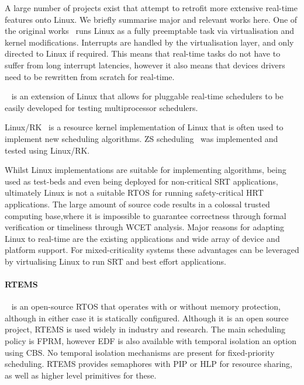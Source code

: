 A large number of projects exist that attempt to retrofit more extensive real-time features onto
Linux.  We briefly summarise major and relevant works here.  One of the original
works~\citep{Yodaiken_Barabanov_97} runs Linux as a fully preemptable task via virtualisation and
kernel modifications.  Interrupts are handled by the virtualisation layer, and only directed to
Linux if required.  This means that real-time tasks do not have to suffer from long interrupt
latencies, however it also means that devices drivers need to be rewritten from scratch for
real-time.

\litmus~\citep{Calandrino_LBDA_07} is an extension of Linux that allows for pluggable real-time
schedulers to be easily developed for testing multiprocessor schedulers.

Linux/RK~\citep{Oikawa_Rajkumar_98} is a resource kernel implementation of Linux that is often used to
implement new scheduling algorithms. \Gls{ZS} scheduling~\citep{deNiz_LR_09} was implemented and
tested using Linux/RK.

Whilst Linux implementations are suitable for implementing algorithms, being used as test-beds and
even being deployed for non-critical \gls{SRT} applications, ultimately Linux is not a suitable
\gls{RTOS} for running safety-critical \gls{HRT} applications. The large amount of source code
results in a colossal trusted computing base,where it is impossible to guarantee correctness through
formal verification or timeliness through {\gls{WCET}} analysis.  Major reasons for adapting Linux
to real-time are the existing applications and wide array of device and platform support. For
mixed-criticality systems these advantages can be leveraged by virtualising Linux to run \gls{SRT}
and best effort applications.

\paragraph{RTEMS}~\citep{RTEMS:URL} is an open-source \gls{RTOS} that operates with or without
memory protection, although in either case it is statically configured.  Although it is an open
source project, RTEMS is used widely in industry and research.  The main scheduling policy is
\gls{FPRM}, however \gls{EDF} is also available with temporal isolation an option using \gls{CBS}.
No temporal isolation mechanisms are present for fixed-priority scheduling.  RTEMS provides
semaphores with \gls{PIP} or \gls{HLP} for resource sharing, as well as
higher level primitives for these. 

